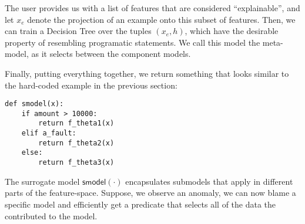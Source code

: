 The user provides us with a list of features that are considered ``explainable'', and let $x_e$ denote the projection of an example onto this subset of features.
Then, we can train a Decision Tree over the tuples $(x_e, h)$, which have the desirable property of resembling programatic statements.
We call this model the meta-model, as it selects between the component models.

Finally, putting everything together, we return something that looks similar to the hard-coded example in the previous section:
\begin{lstlisting}
def smodel(x):
    if amount > 10000:
        return f_theta1(x)
    elif a_fault:
        return f_theta2(x)
    else:
        return f_theta3(x)
\end{lstlisting}
The surrogate model $\textsf{smodel}(\cdot)$ encapsulates submodels that apply in different parts of the feature-space.
Suppose, we observe an anomaly, we can now blame a specific model and efficiently get a predicate that selects all of the data the contributed to the model.